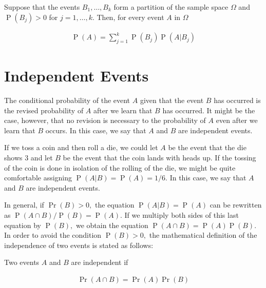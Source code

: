 \documentclass[ 11pt,%
				a4paper,%
				oneside,%
				headinclude,%
				footinclude = true,%
				cleardoublepage = empty,%
				reqno]{scrbook}
\begin{document}
\begin{theorem}
	Suppose that the events $B_{1}, \ldots, B_{k}$ form a partition of the sample space $\Omega$ and $\operatorname{P}\left(B_{j}\right)>0$ for $j=1, \ldots, k .$ Then, for every event $A$ in $\Omega$

	\begin{align*}
		\operatorname{P}(A)=\sum_{j=1}^{k} \operatorname{P}\left(B_{j}\right) \operatorname{P}\left(A | B_{j}\right)
	\end{align*}


\end{theorem}

\section{Independent Events}

The conditional probability of the event $A$ given that the event $B$ has occurred is the revised probability of $A$ after we learn that $B$ has occurred. It might be the case, however, that no revision is necessary to the probability of $A$ even after we learn that $B$ occurs. In this case, we say that $A$ and $B$ are independent events. 


\begin{example}
If we toss a coin and then roll a die, we could let $A$ be the event that the die shows $3$ and let $B$ be the event that the coin lands with heads up. If the tossing of the coin is done in isolation of the rolling of the die, we might be quite comfortable assigning $\operatorname{P}(A | B)=\operatorname{P}(A)=1 / 6$. In this case, we say that $A$ and $B$ are independent events.
\end{example}

In general, if $\operatorname{Pr}(B)>0,$ the equation $\operatorname{P}(A | B)=\operatorname{P}(A)$ can be rewritten as $\operatorname{P}(A \cap B )/ \operatorname{P}(B)=\operatorname{P}(A)$. If we multiply both sides of this last equation by $\operatorname{P}(B),$ we obtain the equation $\operatorname{P}(A \cap B)=\operatorname{P}(A) \operatorname{P}(B) .$ In order to avoid the condition $\operatorname{P}(B)>0,$ the mathematical definition of the independence of two events is stated as follows:


\begin{definition}
Two events $A$ and $B$ are independent if

\begin{align*}
	\operatorname{Pr}(A \cap B)=\operatorname{Pr}(A) \operatorname{Pr}(B)
\end{align*}

\end{definition}
\end{document}
